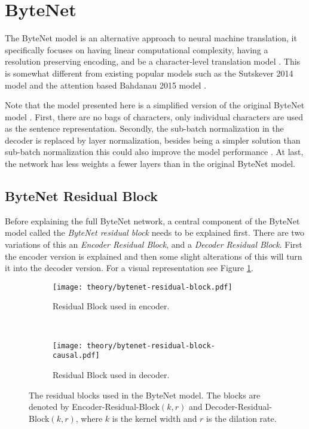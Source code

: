 \section{ByteNet}
\label{sec:theory:bytenet}

The ByteNet model is an alternative approach to neural machine translation, it specifically focuses on having linear computational complexity, having a resolution preserving encoding, and be a character-level translation model \cite{bytenet}. This is somewhat different from existing popular models such as the Sutskever 2014 model \cite{sutskever-2014-nmt} and the attention based Bahdanau 2015 model \cite{bahdanau-2015-nmt}.

Note that the model presented here is a simplified version of the original ByteNet model \cite{bytenet}. First, there are no bags of characters, only individual characters are used as the sentence representation. Secondly, the sub-batch normalization in the decoder is replaced by layer normalization, besides being a simpler solution than sub-batch normalization this could also improve the model performance \cite{layer-normalization}. At last, the network has less weights a fewer layers than in the original ByteNet model.

\subsection{ByteNet Residual Block}

Before explaining the full ByteNet network, a central component of the ByteNet model called the \textit{ByteNet residual block} needs to be explained first. There are two variations of this an \textit{Encoder Residual Block}, and a \textit{Decoder Residual Block}. First the encoder version is explained and then some slight alterations of this will turn it into the decoder version. For a visual representation see Figure \ref{fig:bytenet:residual-block}.

\begin{figure}[h]
    \centering
    \begin{subfigure}[b]{0.45\textwidth}
        \centering
        \texttt{[image: theory/bytenet-residual-block.pdf]}
        \caption{Residual Block used in encoder.}
    \end{subfigure}
    ~ %
    \begin{subfigure}[b]{0.45\textwidth}
        \centering
        \texttt{[image: theory/bytenet-residual-block-causal.pdf]}
        \caption{Residual Block used in decoder.}
    \end{subfigure}
    \caption{The residual blocks used in the ByteNet model. The blocks are denoted by Encoder-Residual-Block$(k,r)$ and Decoder-Residual-Block$(k,r)$, where $k$ is the kernel width and $r$ is the dilation rate.}
    \label{fig:bytenet:residual-block}
\end{figure}


